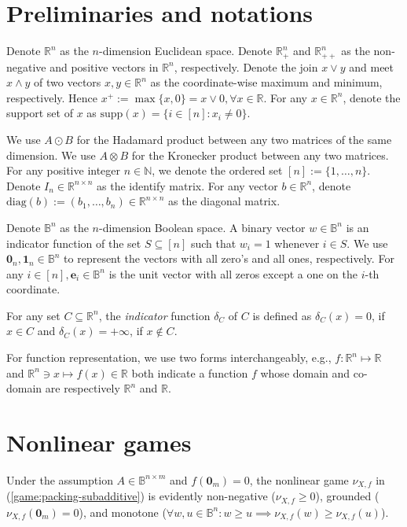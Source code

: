 \documentclass[11pt]{article}\usepackage[]{graphicx}\usepackage[]{xcolor}
\begin{document}
\section{Preliminaries and notations}\label{sec:Preliminaries}


Denote $\mathbb{R}^n$ as the $n$-dimension Euclidean space. Denote $\mathbb{R}^n_{+}$ and $\mathbb{R}^n_{++}$ as the non-negative and positive vectors in $\mathbb{R}^n$, respectively. Denote the join $x\vee y$ and meet $x\wedge y$ of two vectors $x,y\in \mathbb{R}^n$ as the coordinate-wise maximum and minimum, respectively. Hence $x^{+}:=\max\{x, 0\}=x\vee 0, \forall x\in\mathbb{R}$. For any $x\in \mathbb{R}^n$, denote the support set of $x$ as $\text{supp}(x)=\{i\in [n]: x_i\ne 0\}$. 

We use $A\odot B$ for the Hadamard product between any two matrices of the same dimension. We use $A\otimes B$ for the Kronecker product between any two matrices. For any positive integer $n\in\mathbb{N}$, we denote the ordered set $[n]:=\{1, \dots, n\}$. Denote $I_n\in\mathbb{R}^{n\times n}$ as the identify matrix. For any vector $b\in\mathbb{R}^n$, denote $\text{diag} (b):=(b_1, \dots, b_n)\in \mathbb{R}^{n\times n}$ as the diagonal matrix. 

Denote $\mathbb{B}^n$ as the $n$-dimension Boolean space. A binary vector $w\in \mathbb{B}^n$ is an indicator function of the set $S\subseteq [n]$ such that $w_i=1$ whenever $i\in S$. We use $\mathbf{0}_n, \mathbf{1}_n\in \mathbb{B}^n$ to represent the vectors with all zero's and all ones, respectively. For any $i\in [n], \mathbf{e}_i\in \mathbb{B}^n$ is the unit vector with all zeros except a one on the $i$-th coordinate. 

For any set $C\subseteq \mathbb{R}^n$, the \emph{indicator} function $\delta_C$ of $C$ is defined as $\delta_C(x)=0$, if $x\in C$ and $\delta_C(x)=+\infty$, if $x\notin C$. 

For function representation, we use two forms interchangeably, e.g., $f: \mathbb{R}^n\mapsto \mathbb{R}$ and $\mathbb{R}^n\ni x\mapsto f(x)\in \mathbb{R}$ both indicate a function $f$ whose domain and co-domain are respectively $\mathbb{R}^n$ and $\mathbb{R}$. 



\section{Nonlinear games}\label{sec:game:packing-subadditive}

Under the assumption $A\in \mathbb{B}^{n\times m}$ and $f\left(\mathbf{0}_m\right)=0$, the nonlinear game $\nu_{X, f}$ in (\ref{game:packing-subadditive}) is evidently non-negative ($\nu_{X, f}\ge 0$), grounded ($\nu_{X, f}\left(\mathbf{0}_m\right)=0$), and monotone ($\forall w, u\in\mathbb{B}^n: w\ge u\implies \nu_{X, f}(w)\ge \nu_{X, f}(u)$). 
\end{document}
